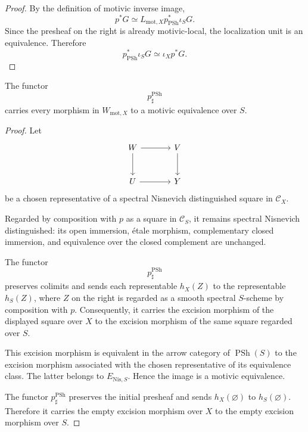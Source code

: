 \begin{proof}
By the definition of motivic inverse image,
\[
    p^*G
    \simeq
    L_{\mathrm{mot},X}
    p^*_{\operatorname{PSh}}\iota_SG.
\]
Since the presheaf on the right is already motivic-local, the
localization unit is an equivalence. Therefore
\[
    p^*_{\operatorname{PSh}}\iota_SG
    \simeq
    \iota_Xp^*G.
\]
\end{proof}

\begin{proposition}
\label{prop:smooth-direct-image-preserves-generators}
The functor
\[
    p^{\operatorname{PSh}}_\sharp
\]
carries every morphism in \(W_{\mathrm{mot},X}\) to a motivic
equivalence over \(S\).
\end{proposition}

\begin{proof}
Let
\[
\begin{tikzcd}[column sep=large, row sep=large]
    W
        \arrow[r]
        \arrow[d]
    &
    V
        \arrow[d]
    \\
    U
        \arrow[r]
    &
    Y
\end{tikzcd}
\]
be a chosen representative of a spectral Nisnevich distinguished square
in \(\mathcal C_X\).

Regarded by composition with \(p\) as a square in \(\mathcal C_S\), it
remains spectral Nisnevich distinguished: its open immersion, étale
morphism, complementary closed immersion, and equivalence over the
closed complement are unchanged.

The functor
\[
    p^{\operatorname{PSh}}_\sharp
\]
preserves colimits and sends each representable \(h_X(Z)\) to the
representable \(h_S(Z)\), where \(Z\) on the right is regarded as a
smooth spectral \(S\)-scheme by composition with \(p\). Consequently,
it carries the excision morphism of the displayed square over \(X\) to
the excision morphism of the same square regarded over \(S\).

This excision morphism is equivalent in the arrow category of
\(\operatorname{PSh}(S)\) to the excision morphism associated with the
chosen representative of its equivalence class. The latter belongs to
\(E_{\mathrm{Nis},S}\). Hence the image is a motivic equivalence.

The functor \(p^{\operatorname{PSh}}_\sharp\) preserves the initial
presheaf and sends \(h_X(\varnothing)\) to \(h_S(\varnothing)\).
Therefore it carries the empty excision morphism over \(X\) to the empty
excision morphism over \(S\).


\end{proof}
